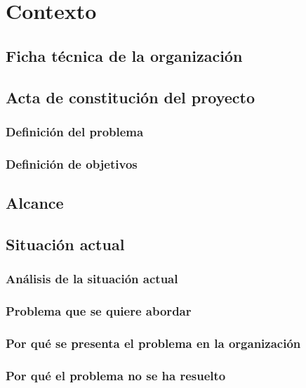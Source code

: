 \chapter{Contexto}
\label{chapter:context}

\section{Ficha técnica de la organización}
\label{section:ficha}

\Blindtext

\section{Acta de constitución del proyecto}
\label{section:acta}

\Blindtext

\subsection{Definición del problema}
\label{subsection:problema}

\Blindtext

\subsection{Definición de objetivos}
\label{subsection:objetivos}

\Blindtext

\section{Alcance}
\label{section:alcance}

\Blindtext

\section{Situación actual}
\label{section:situacion}

\Blindtext

\subsection{Análisis de la situación actual}
\label{subsection:analisis-situacion}

\Blindtext

\subsection{Problema que se quiere abordar}
\label{subsection:problema-situacion}

\Blindtext

\subsection{Por qué se presenta el problema en la organización}
\label{subsection:justificacion-situacion1}

\Blindtext

\subsection{Por qué el problema no se ha resuelto}
\label{subsection:justificacion-situacion2}

\Blindtext
